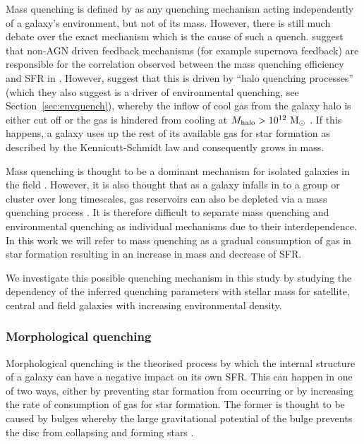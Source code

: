 \documentclass[useAMS,usenatbib]{mn2e}
\def\minor		{\color{minorcol}}
\begin{document}
Mass quenching is defined by \citet{peng10, peng12} as any quenching mechanism acting independently of a galaxy's environment, but not of its mass. However, there is still much debate over the exact mechanism which is the cause of such a quench. \citet{darvish16} suggest that non-AGN driven feedback mechanisms (for example supernova feedback) are responsible for the correlation observed between the mass quenching efficiency and SFR in \citet{peng10}. However, \citet{gabor15} suggest that this is driven by ``halo quenching processes'' {\minor (which they also suggest is a driver of environmental quenching, see Section~\ref{sec:envquench})}, whereby the inflow of cool gas from the galaxy halo is either cut off or the gas is hindered from cooling at $M_{\rm{halo}} > 10^{12}~\rm{M}_{\odot}$ \citep{birnboim03, dekel06}. If this happens, a galaxy uses up the rest of its available gas for star formation as described by the Kennicutt-Schmidt law \citep{schmidt59, kennicutt98} and consequently grows in mass.

Mass quenching is thought to be a dominant mechanism for isolated galaxies in the field \citep{kormendy04}. However, it is also thought that as a galaxy infalls in to a group or cluster over long timescales, gas reservoirs can also be depleted via a mass quenching process \citep{peng12}. {\minor It is therefore difficult to separate mass quenching and environmental quenching as individual mechanisms due to their interdependence. In this work we will refer to mass quenching as a gradual consumption of gas in star formation resulting in an increase in mass and decrease of SFR.}

We investigate this possible quenching mechanism in this study by studying the dependency of the inferred quenching parameters with stellar mass for satellite, central and field galaxies {\minor with increasing environmental density.} 
 
\subsubsection{Morphological quenching}\label{sec:morphquench}

Morphological quenching is the theorised process by which the internal structure of a galaxy can have a negative impact on its own SFR. This can happen in one of two ways, either by preventing star formation from occurring or by increasing the rate of consumption of gas for star formation. The former is thought to be caused by bulges \citep{bluck14} whereby the large gravitational potential of the bulge prevents the disc from collapsing and forming stars \citep{Fang13}. 
\end{document}
